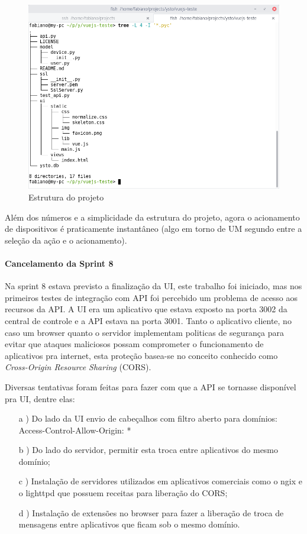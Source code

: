 \begin{figure}[H]
\caption{\label{tree-view-project} Estrutura do projeto}
\includegraphics[scale=0.4]{img/tree-view.png}
\end{figure}

Além dos números e a simplicidade da estrutura do projeto, agora o acionamento de dispositivos é praticamente instantâneo (algo em torno de UM segundo entre a seleção da ação e o acionamento).

\paragraph{Cancelamento da Sprint 8}
Na sprint 8 estava previsto a finalização da UI, este trabalho foi iniciado, mas nos primeiros testes de integração com API foi percebido um problema de acesso aos recursos da API. A UI era um aplicativo que estava exposto na porta 3002 da central de controle e a API estava na porta 3001. Tanto o aplicativo cliente, no caso um browser quanto o servidor implementam politicas de segurança para evitar que ataques maliciosos possam comprometer o funcionamento de aplicativos pra internet, esta proteção basea-se no conceito conhecido como \textit{Cross-Origin Resource Sharing} (CORS).

Diversas tentativas foram feitas para fazer com que a API se tornasse disponível pra UI, dentre elas:

\begin{itemize}
    \item[a]) Do lado da UI envio de cabeçalhos com filtro aberto para domínios: Access-Control-Allow-Origin: *
    \item[b]) Do lado do servidor, permitir esta troca entre aplicativos do mesmo domínio;
    \item[c]) Instalação de servidores utilizados em aplicativos comerciais como o ngix e o lighttpd que possuem receitas para liberação do CORS;
    \item[d]) Instalação de extensões no browser para fazer a liberação de troca de mensagens entre aplicativos que ficam sob o mesmo domínio.
\end{itemize}

